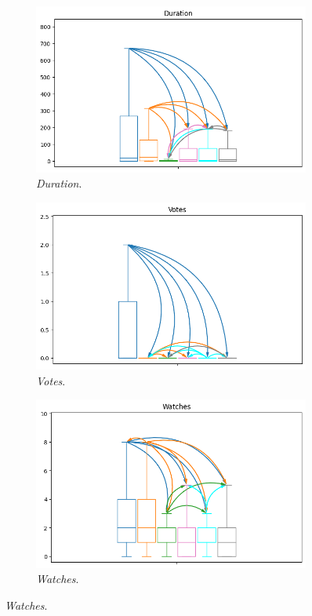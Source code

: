 \documentclass[10pt,a4paper,twocolumn]{article}
\begin{document}
\begin{figure}
    \begin{subfigure}{.4\textwidth}
      \centering
      \includegraphics[width=\linewidth]{rq2_mw/duration_high_conf_plot_arrows.png}
      \caption{\textit{Duration}.}
    \end{subfigure}
    \begin{subfigure}{.4\textwidth}
      \centering
      \includegraphics[width=\linewidth]{rq2_mw/votes_high_conf_plot_arrows.png}
      \caption{\textit{Votes}.}
    \end{subfigure}

    \begin{subfigure}{.4\textwidth}
      \centering
      \includegraphics[width=\linewidth]{rq2_mw/watches_high_conf_plot_arrows.png}
      \caption{\textit{Watches}.}
    \end{subfigure}
      

\end{figure}
\end{document}
